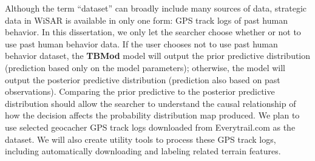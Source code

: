 
Although the term ``dataset'' can broadly include many sources of data, strategic data in WiSAR is available in only one form: GPS track logs of past human behavior. In this dissertation, we only let the searcher choose whether or not to use past human behavior data. If the user chooses not to use past human behavior dataset, the \textbf{TBMod} model will output the prior predictive distribution (prediction based only on the model parameters); otherwise, the model will output the posterior predictive distribution (prediction also based on past observations). Comparing the prior predictive to the posterior predictive distribution should allow the searcher to understand the causal relationship of how the decision affects the probability distribution map produced. We plan to use selected geocacher GPS track logs downloaded from Everytrail.com as the dataset. We will also create utility tools to process these GPS track logs, including automatically downloading and labeling related terrain features.


